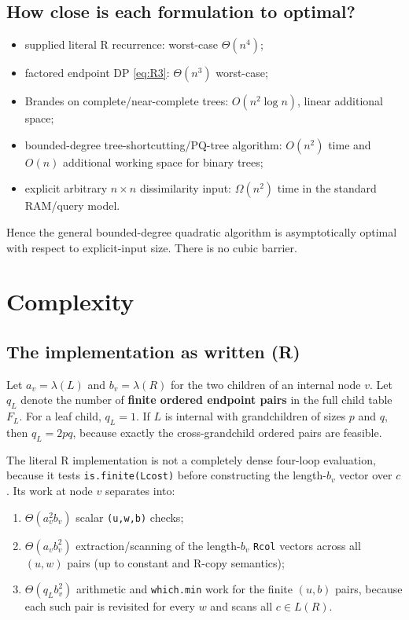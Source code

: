 \documentclass[11pt]{article}
\theoremstyle{plain}
\begin{document}
\subsection{How close is each formulation to optimal?}

\begin{itemize}
\item supplied literal R recurrence: worst-case \(\Theta(n^4)\);
\item factored endpoint DP \eqref{eq:R3}: \(\Theta(n^3)\) worst-case;
\item Brandes on complete/near-complete trees: \(O(n^2\log n)\), linear
  additional space;
\item bounded-degree tree-shortcutting/PQ-tree algorithm: \(O(n^2)\) time and
  \(O(n)\) additional working space for binary trees;
\item explicit arbitrary \(n\times n\) dissimilarity input: \(\Omega(n^2)\) time
  in the standard RAM/query model.
\end{itemize}

Hence the general bounded-degree quadratic algorithm is asymptotically optimal
with respect to explicit-input size. There is no cubic barrier.

\section{Complexity}
\label{sec:complexity}

\subsection{The implementation as written (R)}

Let \(a_v=\lambda(L)\) and \(b_v=\lambda(R)\) for the two children of an
internal node \(v\). Let \(q_L\) denote the number of \textbf{finite ordered
endpoint pairs} in the full child table \(F_L\). For a leaf child, \(q_L=1\).
If \(L\) is internal with grandchildren of sizes \(p\) and \(q\), then
\(q_L=2pq\), because exactly the cross-grandchild ordered pairs are feasible.

The literal R implementation is not a completely dense four-loop evaluation,
because it tests \texttt{is.finite(Lcost)} before constructing the
length-\(b_v\) vector over \(c\). Its work at node \(v\) separates into:

\begin{enumerate}[label=\arabic*.]
\item \(\Theta(a_v^2 b_v)\) scalar \texttt{(u,w,b)} checks;
\item \(\Theta(a_v b_v^2)\) extraction/scanning of the length-\(b_v\)
  \texttt{Rcol} vectors across all \((u,w)\) pairs (up to constant and R-copy
  semantics);
\item \(\Theta(q_L b_v^2)\) arithmetic and \texttt{which.min} work for the
  finite \((u,b)\) pairs, because each such pair is revisited for every \(w\)
  and scans all \(c\in L(R)\).
\end{enumerate}
\end{document}
